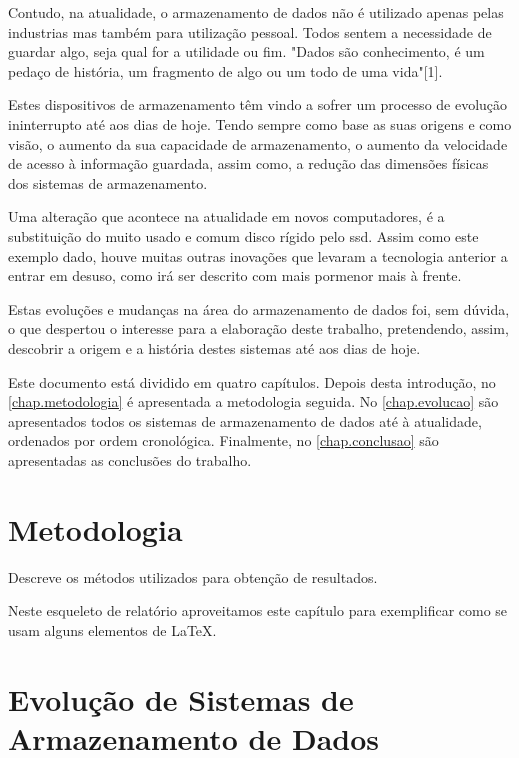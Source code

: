 \documentclass{report}
\begin{document}
	Contudo, na atualidade, o armazenamento de dados não é utilizado apenas pelas industrias mas também para utilização pessoal. Todos sentem a necessidade de guardar algo, seja qual for a utilidade ou fim. "Dados são conhecimento, é um pedaço de história, um fragmento de algo ou um todo de uma vida"[1].
\vspace{1mm}
	
	Estes dispositivos de armazenamento têm vindo a sofrer um processo de evolução ininterrupto até aos dias de hoje. Tendo sempre como base as suas origens e como visão, o aumento da sua capacidade de armazenamento, o aumento da velocidade de acesso à informação guardada, assim como, a redução das dimensões físicas dos sistemas de armazenamento.
\vspace{1mm}
	
	Uma alteração que acontece na atualidade em novos computadores, é a substituição do muito usado e comum disco rígido pelo \ac{ssd}. Assim como este exemplo dado, houve muitas outras inovações que levaram a tecnologia anterior a entrar em desuso, como irá ser descrito com mais pormenor mais à frente.
\vspace{2mm}

	Estas evoluções e mudanças na área do armazenamento de dados foi, sem dúvida, o que despertou o interesse para a elaboração deste trabalho, pretendendo, assim, descobrir a origem e a história destes sistemas até aos dias de hoje.
\vspace{2mm}


Este documento está dividido em quatro capítulos.
Depois desta introdução, no \autoref{chap.metodologia} é apresentada a metodologia seguida.
	No \autoref{chap.evolucao} são apresentados todos os sistemas de armazenamento de dados até à atualidade, ordenados por ordem cronológica. 
	Finalmente, no \autoref{chap.conclusao} são apresentadas
as conclusões do trabalho.

\chapter{Metodologia}
\label{chap.metodologia}
Descreve os métodos utilizados para obtenção de resultados.

Neste esqueleto de relatório aproveitamos este capítulo para exemplificar
como se usam alguns elementos de {\LaTeX}.

\newpage

\chapter{Evolução de Sistemas de Armazenamento de Dados}
\label{chap.evolucao}
\end{document}
